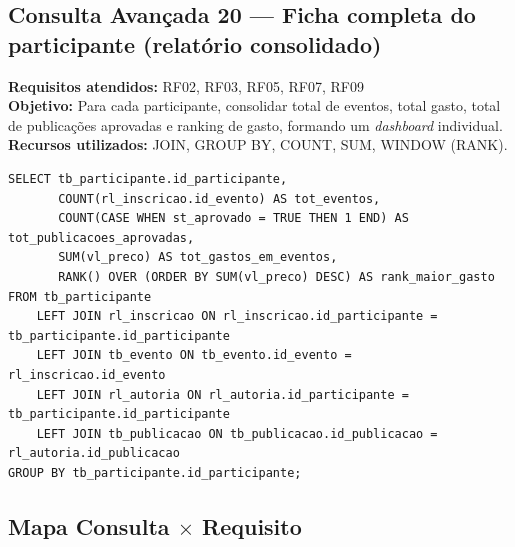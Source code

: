 \documentclass[12pt,a4paper]{article}
\begin{document}
\subsection{Consulta Avançada 20 --- Ficha completa do participante (relatório consolidado)}
\textbf{Requisitos atendidos:} RF02, RF03, RF05, RF07, RF09 \\
\textbf{Objetivo:} Para cada participante, consolidar total de eventos, total gasto, total de publicações aprovadas e ranking de gasto, formando um \textit{dashboard} individual. \\
\textbf{Recursos utilizados:} JOIN, GROUP BY, COUNT, SUM, WINDOW (RANK).
\begin{lstlisting}[caption={QA20 --- Ficha completa do participante (relatório consolidado).}]
SELECT tb_participante.id_participante,
       COUNT(rl_inscricao.id_evento) AS tot_eventos,
       COUNT(CASE WHEN st_aprovado = TRUE THEN 1 END) AS tot_publicacoes_aprovadas,
       SUM(vl_preco) AS tot_gastos_em_eventos,
       RANK() OVER (ORDER BY SUM(vl_preco) DESC) AS rank_maior_gasto
FROM tb_participante
    LEFT JOIN rl_inscricao ON rl_inscricao.id_participante = tb_participante.id_participante
    LEFT JOIN tb_evento ON tb_evento.id_evento = rl_inscricao.id_evento
    LEFT JOIN rl_autoria ON rl_autoria.id_participante = tb_participante.id_participante
    LEFT JOIN tb_publicacao ON tb_publicacao.id_publicacao = rl_autoria.id_publicacao
GROUP BY tb_participante.id_participante;
\end{lstlisting}

\subsection{Mapa Consulta $\times$ Requisito}
\end{document}

